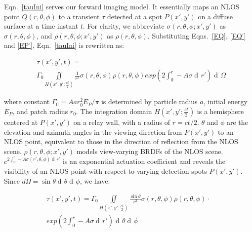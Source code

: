 \documentclass[10pt,journal,compsoc]{IEEEtran}
\DeclareMathOperator{\di}{d\!}
\begin{document}
Eqn.~\ref{tauIni} serves our forward imaging model. It essentially maps an NLOS point $Q(r, \theta,\phi)$ to a transient $\tau$ detected at a spot $P(x', y')$ on a diffuse surface at a time instant $t$.  For clarity, we abbreviate $\sigma(r, \theta,\phi ; x', y')$ as $\sigma(r, \theta, \phi)$, and $\rho(r, \theta,\phi ; x', y')$ as $\rho(r, \theta, \phi)$. Substituting Eqns.~\ref{EQ}, \ref{EQ'} and \ref{EP'}, Eqn.~\ref{tauIni} is rewritten as:  

\begin{equation}
\begin{split}
    & \tau(x', y', t) = \\ 
    & \Gamma_{0} \underset{H(x', y';\frac{ct}{2})}{\iint} \frac{1}{r^2} \sigma(r, \theta, \phi) \rho(r, \theta, \phi)  exp{\left(2\int_{0}^{r}-A\sigma \di{r'}\right)} \di{\Omega} 
\end{split}
\label{domega}
\end{equation}

\noindent where constant $\Gamma_{0} = {Aar_0^2E_P}/\pi$ is determined by particle radius $a$, initial energy $E_{P}$, and patch radius $r_0$. The integration domain $H(x', y';\frac{ct}{2})$ is a hemisphere centered at $P(x',y')$ on a relay wall, with a radius of $r=ct/2$. $\theta$ and $\phi$ are the elevation and azimuth angles in the viewing direction from $P(x',y')$ to an NLOS point, equivalent to those in the direction of reflection from the NLOS scene. $\rho(r, \theta,\phi ; x', y')$ models view-varying BRDFs of the NLOS scene. $e^{2\int_{0}^{r}-A\sigma(r',\theta,\phi) \di{r'}}$ is an exponential actuation coefficient and reveals the visibility of an NLOS point with respect to varying detection spots $P(x',y')$. Since $d\Omega = \sin{\theta}\di \theta \di \phi$, we have: 
    
\begin{equation}
\begin{split}
    \tau(x', y', t) = \Gamma_{0} \underset{H(x',y';\frac{ct}{2})}{\iint} \frac{\sin{\theta}}{r^2} \sigma(r, \theta, \phi) \rho(r, \theta, \phi) \cdot \\
    exp{\left(2\int_{0}^{r}-A\sigma \di{r'}\right)} \di{\theta} \di{\phi}
\end{split}
\label{tau}
\end{equation}

\end{document}
